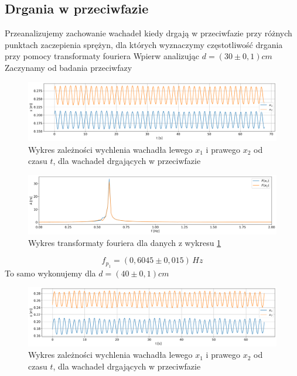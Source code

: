 \documentclass[12pt]{article}
\begin{document}
\subsection{Drgania w przeciwfazie}
Przeanalizujemy zachowanie wachadeł kiedy drgają w przeciwfazie przy różnych punktach zaczepienia sprężyn, dla których wyznaczymy częstotliwość drgania przy pomocy transformaty fouriera
Wpierw analizując \(d = (30 \pm 0{,}1) cm\)
Zaczynamy od badania przeciwfazy
\begin{figure}[H]
    \centering
    \includegraphics[width=\linewidth]{counterphase_1}
    \caption{Wykres zależności wychlenia wachadła lewego \(x_1\) i prawego \(x_2\) od czasu \(t\), dla wachadeł drgających w przeciwfazie}
    \label{fig:counter_phase_0}
\end{figure}
\begin{figure}[H]
    \centering
    \includegraphics[width=\linewidth]{counterphase_1_fft}
    \caption{Wykres transformaty fouriera dla danych z wykresu \ref{fig:counter_phase_0}}
    \label{fig:coutner_phase_0_fft}
\end{figure}
\[
    f_{p_1} = (0{,}6045 \pm 0{,}015) \, Hz
\]
To samo wykonujemy dla \(d = (40 \pm 0{,}1) cm\)
\begin{figure}[H]
    \centering
    \includegraphics[width=\linewidth]{counterphase_2}
    \caption{Wykres zależności wychlenia wachadła lewego \(x_1\) i prawego \(x_2\) od czasu \(t\), dla wachadeł drgających w przeciwfazie}
    \label{fig:counter_phase_1}
\end{figure}
\end{document}
